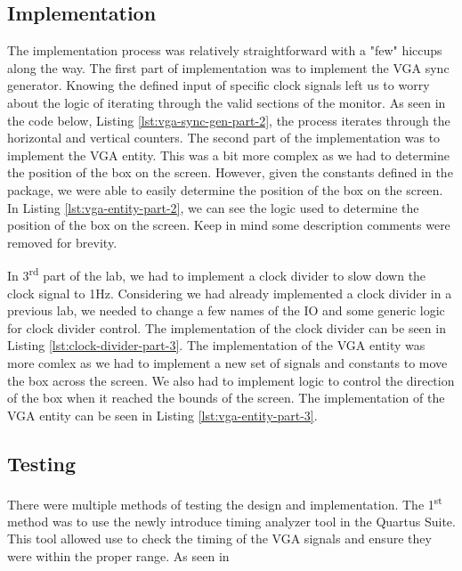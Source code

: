 \documentclass{article}
\begin{document}
\subsection*{Implementation}
The implementation process was relatively straightforward with a "few" hiccups along the way. The first part of implementation was to implement the VGA sync generator. Knowing the defined input of specific clock signals left us to worry about the logic of iterating through the valid sections of the monitor. As seen in the code below, Listing \ref{lst:vga-sync-gen-part-2}, the process iterates through the horizontal and vertical counters. The second part of the implementation was to implement the VGA entity. This was a bit more complex as we had to determine the position of the box on the screen. However, given the constants defined in the package, we were able to easily determine the position of the box on the screen. In Listing \ref{lst:vga-entity-part-2}, we can see the logic used to determine the position of the box on the screen. Keep in mind some description comments were removed for brevity.

In 3\textsuperscript{rd} part of the lab, we had to implement a clock divider to slow down the clock signal to 1Hz. Considering we had already implemented a clock divider in a previous lab, we needed to change a few names of the IO and some generic logic for clock divider control. The implementation of the clock divider can be seen in Listing \ref{lst:clock-divider-part-3}. The implementation of the VGA entity was more comlex as we had to implement a new set of signals and constants to move the box across the screen. We also had to implement logic to control the direction of the box when it reached the bounds of the screen. The implementation of the VGA entity can be seen in Listing \ref{lst:vga-entity-part-3}.

\subsection*{Testing}
There were multiple methods of testing the design and implementation. The 1\textsuperscript{st} method was to use the newly introduce timing analyzer tool in the Quartus Suite. This tool allowed use to check the timing of the VGA signals and ensure they were within the proper range. As seen in 
\end{document}
